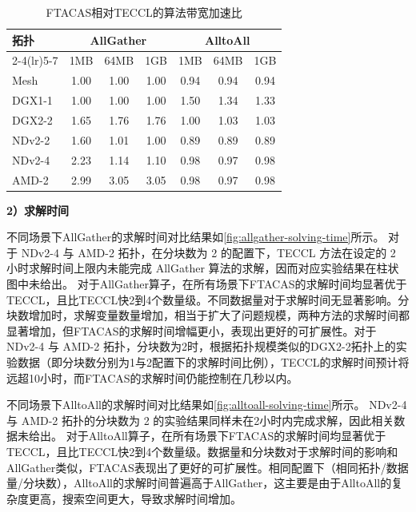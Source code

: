 \begin{table}[!htbp]
\centering
\caption{FTACAS相对TECCL的算法带宽加速比}
\label{tab:speedup_ab_chunk1_opcol}
\setlength{\tabcolsep}{4.5pt}
\begin{tabular}{lcccccc}
\toprule
\multirow{2}{*}{拓扑} & \multicolumn{3}{c}{AllGather} & \multicolumn{3}{c}{AlltoAll} \\
\cmidrule(lr){2-4}\cmidrule(lr){5-7}
& 1MB & 64MB & 1GB & 1MB & 64MB & 1GB \\
\midrule
Mesh
& 1.00 & 1.00 & 1.00
& 0.94 & 0.94 & 0.94 \\
DGX1-1
& 1.00 & 1.00 & 1.00
& 1.50 & 1.34 & 1.33 \\
DGX2-2
& 1.65 & 1.76 & 1.76
& 1.00 & 1.03 & 1.03 \\
NDv2-2
& 1.60 & 1.01 & 1.00
& 0.89 & 0.89 & 0.89 \\
NDv2-4
& 2.23 & 1.14 & 1.10
& 0.98 & 0.97 & 0.98 \\
AMD-2
& 2.99 & 3.05 & 3.05
& 0.98 & 0.97 & 0.98 \\
\bottomrule
\end{tabular}
\end{table}



\noindent\quad\textbf{2）求解时间}

不同场景下AllGather的求解时间对比结果如\autoref {fig:allgather-solving-time}所示。
对于 NDv2-4 与 AMD-2 拓扑，在分块数为 2 的配置下，TECCL 方法在设定的 2 小时求解时间上限内未能完成 AllGather 算法的求解，因而对应实验结果在柱状图中未给出。
对于AllGather算子，在所有场景下FTACAS的求解时间均显著优于TECCL，且比TECCL快2到4个数量级。不同数据量对于求解时间无显著影响。分块数增加时，求解变量数量增加，相当于扩大了问题规模，两种方法的求解时间都显著增加，但FTACAS的求解时间增幅更小，表现出更好的可扩展性。对于 NDv2-4 与 AMD-2 拓扑，分块数为2时，根据拓扑规模类似的DGX2-2拓扑上的实验数据（即分块数分别为1与2配置下的求解时间比例），TECCL的求解时间预计将远超10小时，而FTACAS的求解时间仍能控制在几秒以内。

不同场景下AlltoAll的求解时间对比结果如\autoref {fig:alltoall-solving-time}所示。
NDv2-4 与 AMD-2 拓扑的分块数为 2 的实验结果同样未在2小时内完成求解，因此相关数据未给出。
对于AlltoAll算子，在所有场景下FTACAS的求解时间均显著优于TECCL，且比TECCL快2到4个数量级。数据量和分块数对于求解时间的影响和AllGather类似，FTACAS表现出了更好的可扩展性。相同配置下（相同拓扑/数据量/分块数），AlltoAll的求解时间普遍高于AllGather，这主要是由于AlltoAll的复杂度更高，搜索空间更大，导致求解时间增加。

